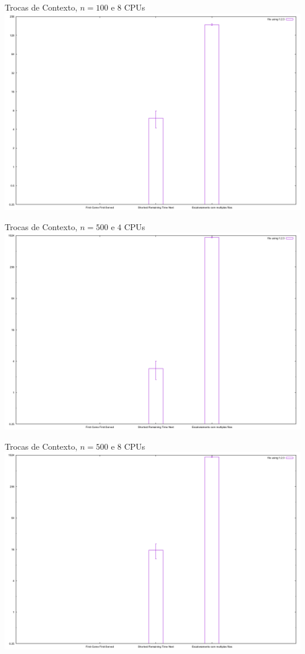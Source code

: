 \documentclass{beamer}
\begin{document}
\begin{frame}{Trocas de Contexto, $n = 100$ e $8$ CPUs}
	\includegraphics[width=\textwidth]{graphs/testes_capella/result/trocas-r8-100}
\end{frame}


\begin{frame}{Trocas de Contexto, $n = 500$ e $4$ CPUs}
	\includegraphics[width=\textwidth]{graphs/testes_capella/result/trocas-r4-500}
\end{frame}


\begin{frame}{Trocas de Contexto, $n = 500$ e $8$ CPUs}
	\includegraphics[width=\textwidth]{graphs/testes_capella/result/trocas-r8-500}
\end{frame}
\end{document}

